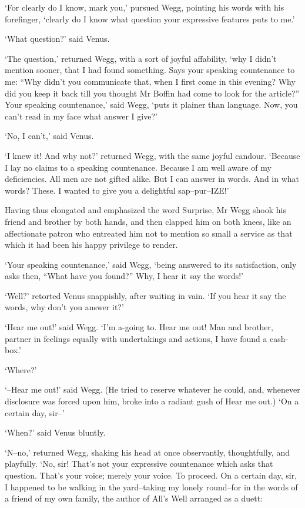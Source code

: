 ‘For clearly do I know, mark you,’ pursued Wegg, pointing his words
with his forefinger, ‘clearly do I know what question your expressive
features puts to me.’

‘What question?’ said Venus.

‘The question,’ returned Wegg, with a sort of joyful affability, ‘why
I didn’t mention sooner, that I had found something. Says your speaking
countenance to me: “Why didn’t you communicate that, when I first come
in this evening? Why did you keep it back till you thought Mr Boffin had
come to look for the article?” Your speaking countenance,’ said Wegg,
‘puts it plainer than language. Now, you can’t read in my face what
answer I give?’

‘No, I can’t,’ said Venus.

‘I knew it! And why not?’ returned Wegg, with the same joyful candour.
‘Because I lay no claims to a speaking countenance. Because I am well
aware of my deficiencies. All men are not gifted alike. But I can answer
in words. And in what words? These. I wanted to give you a delightful
sap--pur--IZE!’

Having thus elongated and emphasized the word Surprise, Mr Wegg shook
his friend and brother by both hands, and then clapped him on both
knees, like an affectionate patron who entreated him not to mention so
small a service as that which it had been his happy privilege to render.

‘Your speaking countenance,’ said Wegg, ‘being answered to its
satisfaction, only asks then, “What have you found?” Why, I hear it say
the words!’

‘Well?’ retorted Venus snappishly, after waiting in vain. ‘If you hear
it say the words, why don’t you answer it?’

‘Hear me out!’ said Wegg. ‘I’m a-going to. Hear me out! Man and brother,
partner in feelings equally with undertakings and actions, I have found
a cash-box.’

‘Where?’

‘--Hear me out!’ said Wegg. (He tried to reserve whatever he could, and,
whenever disclosure was forced upon him, broke into a radiant gush of
Hear me out.) ‘On a certain day, sir--’

‘When?’ said Venus bluntly.

‘N--no,’ returned Wegg, shaking his head at once observantly,
thoughtfully, and playfully. ‘No, sir! That’s not your expressive
countenance which asks that question. That’s your voice; merely your
voice. To proceed. On a certain day, sir, I happened to be walking in
the yard--taking my lonely round--for in the words of a friend of my own
family, the author of All’s Well arranged as a duett:

